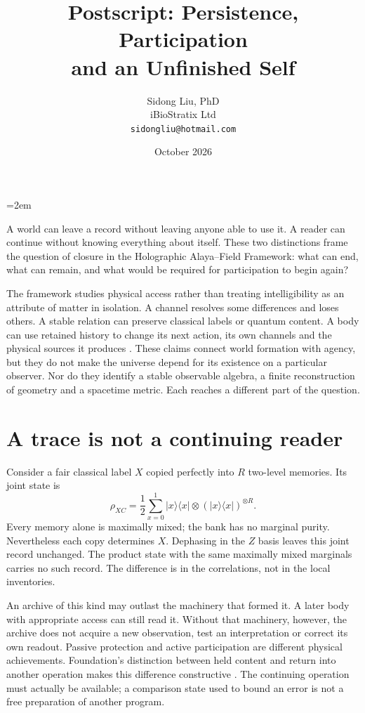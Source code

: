\documentclass[12pt,a4paper]{article}
\title{Postscript: Persistence, Participation\\and an Unfinished Self}
\author{Sidong Liu, PhD\\iBioStratix Ltd\\\texttt{sidongliu@hotmail.com}}
\date{October 2026}
\begin{document}
\emergencystretch=2em
\raggedbottom
\maketitle

A world can leave a record without leaving anyone able to use it. A reader can continue without knowing everything about itself. These two distinctions frame the question of closure in the Holographic Alaya--Field Framework: what can end, what can remain, and what would be required for participation to begin again?

The framework studies physical access rather than treating intelligibility as an attribute of matter in isolation. A channel resolves some differences and loses others. A stable relation can preserve classical labels or quantum content. A body can use retained history to change its next action, its own channels and the physical sources it produces \cite{A,B,C,D,G,FoundationIII}. These claims connect world formation with agency, but they do not make the universe depend for its existence on a particular observer. Nor do they identify a stable observable algebra, a finite reconstruction of geometry and a spacetime metric. Each reaches a different part of the question.

\section{A trace is not a continuing reader}

Consider a fair classical label $X$ copied perfectly into $R$ two-level memories. Its joint state is
\[
 \rho_{XC}=\frac12\sum_{x=0}^1
 |x\rangle\langle x|\otimes
 (|x\rangle\langle x|)^{\otimes R}.
\]
Every memory alone is maximally mixed; the bank has no marginal purity. Nevertheless each copy determines $X$. Dephasing in the $Z$ basis leaves this joint record unchanged. The product state with the same maximally mixed marginals carries no such record. The difference is in the correlations, not in the local inventories.

An archive of this kind may outlast the machinery that formed it. A later body with appropriate access can still read it. Without that machinery, however, the archive does not acquire a new observation, test an interpretation or correct its own readout. Passive protection and active participation are different physical achievements. Foundation's distinction between held content and return into another operation makes this difference constructive \cite{Foundation}. The continuing operation must actually be available; a comparison state used to bound an error is not a free preparation of another program.
\end{document}
